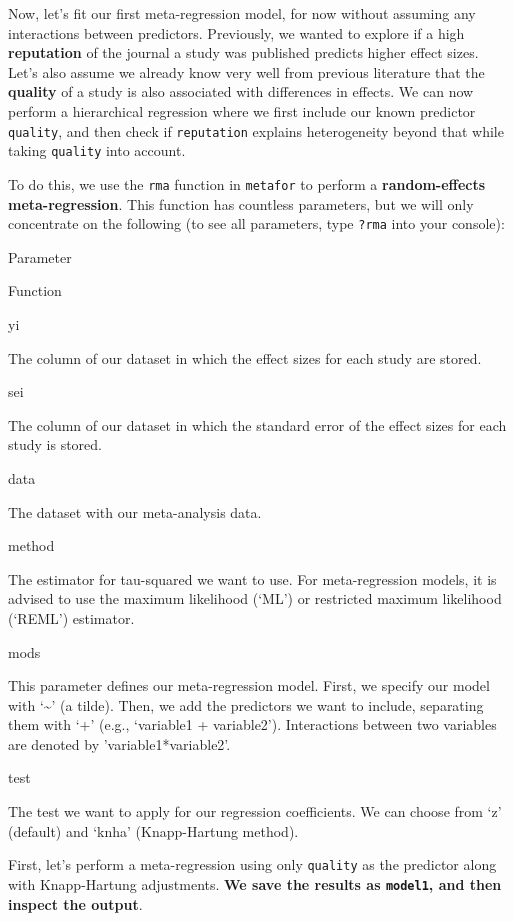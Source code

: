 \documentclass[]{book}
\begin{document}
Now, let's fit our first meta-regression model, for now without assuming any interactions between predictors. Previously, we wanted to explore if a high \textbf{reputation} of the journal a study was published predicts higher effect sizes. Let's also assume we already know very well from previous literature that the \textbf{quality} of a study is also associated with differences in effects. We can now perform a hierarchical regression where we first include our known predictor \texttt{quality}, and then check if \texttt{reputation} explains heterogeneity beyond that while taking \texttt{quality} into account.

To do this, we use the \texttt{rma} function in \texttt{metafor} to perform a \textbf{random-effects meta-regression}. This function has countless parameters, but we will only concentrate on the following (to see all parameters, type \texttt{?rma} into your console):

Parameter

Function

yi

The column of our dataset in which the effect sizes for each study are stored.

sei

The column of our dataset in which the standard error of the effect sizes for each study is stored.

data

The dataset with our meta-analysis data.

method

The estimator for tau-squared we want to use. For meta-regression models, it is advised to use the
maximum likelihood (`ML') or restricted maximum likelihood (`REML') estimator.

mods

This parameter defines our meta-regression model. First, we specify our model with `\textasciitilde{}' (a tilde). Then, we add the predictors we want to include, separating them with `+' (e.g., `variable1 + variable2'). Interactions between two variables are denoted by 'variable1*variable2'.

test

The test we want to apply for our regression coefficients. We can choose from `z' (default) and `knha' (Knapp-Hartung method).

First, let's perform a meta-regression using only \texttt{quality} as the predictor along with Knapp-Hartung adjustments. \textbf{We save the results as \texttt{model1}, and then inspect the output}.
\end{document}
